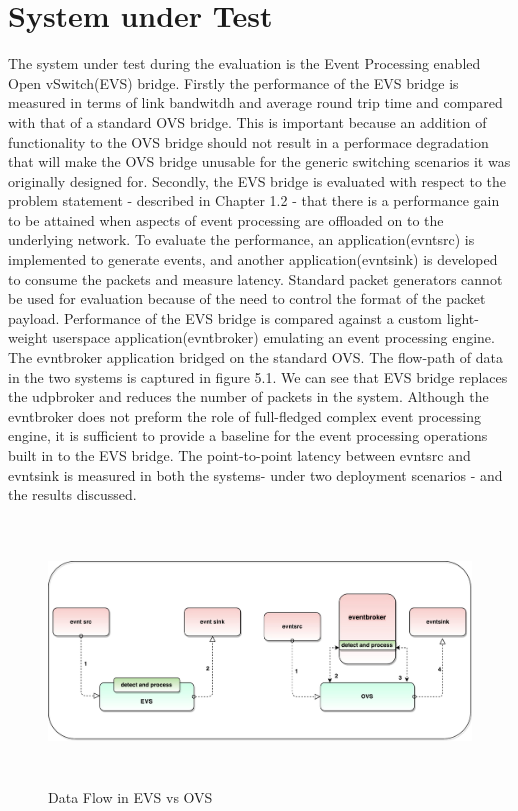 \section{System under Test}
The system under test during the evaluation is the Event Processing enabled Open vSwitch(EVS) bridge. Firstly the performance of the EVS bridge is measured in terms of link bandwitdh and average round trip time and compared with that of a standard OVS bridge. This is important because an addition of functionality to the OVS bridge should not result in a performace degradation that will make the OVS bridge unusable for the generic switching scenarios it was originally designed for. 
\newline
Secondly, the EVS bridge is evaluated with respect to the problem statement - described in Chapter 1.2 - that there is a performance gain to be attained when aspects of event processing are offloaded on to the underlying network. To evaluate the performance, an  application(evntsrc) is implemented to generate events, and another application(evntsink) is developed to consume the packets and measure latency. Standard packet generators cannot be used for evaluation because of the need to control the format of the packet payload. Performance of the EVS bridge is compared against a custom light-weight userspace application(evntbroker) emulating an event processing engine. The evntbroker application bridged on the standard OVS. The flow-path of data in the two systems is captured in figure 5.1. We can see that EVS bridge replaces the udpbroker and reduces the number of packets in the system. Although the evntbroker does not preform the role of full-fledged complex event processing engine, it is sufficient to provide a baseline for the event processing operations built in to the EVS bridge. The point-to-point latency between evntsrc and evntsink is measured in both the systems- under two deployment scenarios - and the results discussed.

 \begin{figure}[H]    
 \caption{Data Flow in EVS vs OVS}
  \includegraphics[height=7cm]{evsovs.pdf}
\end{figure}



